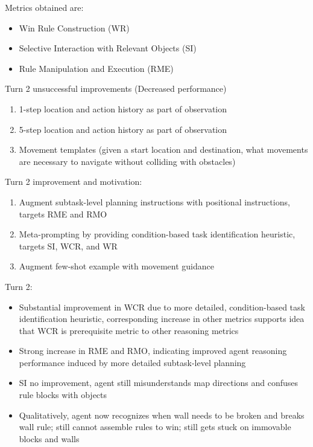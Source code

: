Metrics obtained are:
\begin{itemize}
    \item Win Rule Construction (WR)
    \item Selective Interaction with Relevant Objects (SI)
    \item Rule Manipulation and Execution (RME)
\end{itemize}

Turn 2 unsuccessful improvements (Decreased performance)
\begin{enumerate}
    \item 1-step location and action history as part of observation
    \item 5-step location and action history as part of observation
    \item Movement templates (given a start location and destination, what movements are necessary to navigate without colliding with obstacles)
\end{enumerate}

Turn 2 improvement and motivation:
\begin{enumerate}
    \item Augment subtask-level planning instructions with positional instructions, targets RME and RMO
    \item Meta-prompting by providing condition-based task identification heuristic, targets SI, WCR, and WR
    \item Augment few-shot example with movement guidance
\end{enumerate}


Turn 2:


\begin{itemize}
    \item Substantial improvement in WCR due to more detailed, condition-based task identification heuristic, corresponding increase in other metrics supports idea that WCR is prerequisite metric to other reasoning metrics
    \item Strong increase in RME and RMO, indicating improved agent reasoning performance induced by more detailed subtask-level planning  
    \item SI no improvement, agent still misunderstands map directions and confuses rule blocks with objects
    \item Qualitatively, agent now recognizes when wall needs to be broken and breaks wall rule; still cannot assemble rules to win; still gets stuck on immovable blocks and walls
\end{itemize}

